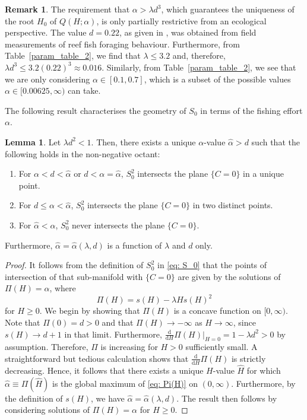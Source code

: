 \documentclass{article}
\theoremstyle{definition}
\numberwithin{equation}{section}
\newtheorem{lem}[prop]{Lemma}
\newtheorem{remark}[prop]{Remark}
\newcommand{\dd}{\mathrm{d}}
\begin{document}
\begin{remark}
The requirement that $\alpha>\lambda d^3$, which guarantees the uniqueness of the root $H_0$ of $Q(H;\alpha)$, is only partially restrictive from an ecological perspective. The value $d=0.22$, as given in \cite{gil2020}, was obtained from field measurements of reef fish foraging behaviour. Furthermore, from Table~\ref{param_table_2}, we find that $\lambda\leq 3.2$ and, therefore, $\lambda d^3\leq 3.2(0.22)^3\approx0.016$. Similarly, from Table~\ref{param_table_2}, we see that we are only considering $\alpha\in [0.1,0.7]$, which is a subset of the possible values $\alpha\in [0.00625, \infty)$ can take.
\end{remark}
The following result characterises the geometry of $S_0$ in terms of the fishing effort $\alpha$.
\begin{lem}
    Let $\lambda d^2<1$. Then, there exists a unique $\alpha$-value $\hat{\alpha}>d$ such that the following holds in the non-negative octant:
    \begin{enumerate}
        \item For $\alpha< d<\hat{\alpha}$ or $d<\alpha=\hat{\alpha}$, $S_0^2$ intersects the plane $\{C=0\}$ in a unique point.
        \item For $d\leq \alpha<\hat{\alpha}$, $S_0^2$ intersects the plane $\{C=0\}$ in two distinct points.
        \item For $\hat{\alpha}<\alpha$, $S_0^2$ never intersects the plane $\{C=0\}$.
    \end{enumerate}
    Furthermore, $\hat{\alpha}=\hat\alpha(\lambda, d)$ is a function of $\lambda$ and $d$ only.
    \label{lem: S_0^2 intersections}
\end{lem}
\begin{proof}
    It follows from the definition of $S_0^2$ in \eqref{eq: S_0} that the points of intersection of that sub-manifold with $\{C=0\}$ are given by the solutions of $\Pi(H)=\alpha$, where 
    \begin{equation}
        \Pi(H)=s(H)-\lambda H s(H)^2
        \label{eq: Pi(H)}
    \end{equation}
    for $H\geq 0$.
    We begin by showing that $\Pi(H)$ is a concave function on $[0, \infty)$. Note that $\Pi(0)=d>0$ and that $\Pi(H)\to -\infty$ as $H\to \infty$, since $s(H)\to d+1$ in that limit. Furthermore, $\frac{\dd}{\dd H}\Pi(H)\big\lvert_{H=0}=1-\lambda d^2>0$ by assumption. Therefore, $\Pi$ is increasing for $H>0$ sufficiently small. A straightforward but tedious calculation shows that $\frac{\dd}{\dd H}\Pi(H)$ is strictly decreasing. Hence, it follows that there exists a unique $H$-value $\hat{H}$ for which $\hat{\alpha}\equiv\Pi(\hat{H})$ is the global maximum of \eqref{eq: Pi(H)} on $(0, \infty)$. Furthermore, by the definition of $s(H)$, we have $\hat\alpha=\hat\alpha(\lambda,d)$. The result then follows by considering solutions of $\Pi(H)=\alpha$ for $H\geq 0$.
\end{proof}
\end{document}
